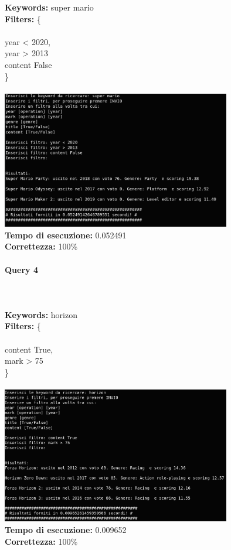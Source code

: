 \documentclass[12pt]{article}
\begin{document}
\noindent \textbf{Keywords: } super mario \\
\textbf{Filters: } \{ \\ \\
\indent year < 2020, \\
\indent year > 2013 \\
\indent content False \\
\} \\\\

\noindent \includegraphics[width=100mm]{Immagini/Image3.png} \\
\textbf{Tempo di esecuzione:} 0.052491 \\
\textbf{Correttezza:} 100\% \pagebreak

\paragraph{Query 4} ~ \\ \\

\noindent \textbf{Keywords: } horizon \\
\textbf{Filters: } \{ \\ \\
\indent content True, \\
\indent mark > 75 \\
\} \\\\

\noindent \includegraphics[width=100mm]{Immagini/Image4.png} \\
\textbf{Tempo di esecuzione:} 0.009652 \\
\textbf{Correttezza:} 100\% \pagebreak
\end{document}
